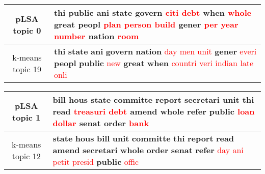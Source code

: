 \begin{center}\begin{tabularx}{\textwidth} {
  | c | >{\raggedright\arraybackslash}X | } \hline 
pLSA topic 0 & \textbf{thi} \textbf{public} \textbf{ani} \textbf{state} \textbf{govern} \textcolor{red}{citi} \textcolor{red}{debt} \textbf{when} \textcolor{red}{whole} \textbf{great} \textbf{peopl} \textcolor{red}{plan} \textcolor{red}{person} \textcolor{red}{build} \textbf{gener} \textcolor{red}{per} \textcolor{red}{year} \textcolor{red}{number} \textbf{nation} \textcolor{red}{room} \\ \hline 
k-means topic 19 & \textbf{thi} \textbf{state} \textbf{ani} \textbf{govern} \textbf{nation} \textcolor{red}{day} \textcolor{red}{men} \textcolor{red}{unit} \textbf{gener} \textcolor{red}{everi} \textbf{peopl} \textbf{public} \textcolor{red}{new} \textbf{great} \textbf{when} \textcolor{red}{countri} \textcolor{red}{veri} \textcolor{red}{indian} \textcolor{red}{late} \textcolor{red}{onli} \\ \hline 
\end{tabularx}

\end{center}

\begin{center}\begin{tabularx}{\textwidth} {
  | c | >{\raggedright\arraybackslash}X | } \hline 
pLSA topic 1 & \textbf{bill} \textbf{hous} \textbf{state} \textbf{committe} \textbf{report} \textbf{secretari} \textbf{unit} \textbf{thi} \textbf{read} \textcolor{red}{treasuri} \textcolor{red}{debt} \textbf{amend} \textbf{whole} \textbf{refer} \textbf{public} \textcolor{red}{loan} \textcolor{red}{dollar} \textbf{senat} \textbf{order} \textcolor{red}{bank} \\ \hline 
k-means topic 12 & \textbf{state} \textbf{hous} \textbf{bill} \textbf{unit} \textbf{committe} \textbf{thi} \textbf{report} \textbf{read} \textbf{amend} \textbf{secretari} \textbf{whole} \textbf{order} \textbf{senat} \textbf{refer} \textcolor{red}{day} \textcolor{red}{ani} \textcolor{red}{petit} \textcolor{red}{presid} \textbf{public} \textcolor{red}{offic} \\ \hline 
\end{tabularx}

\end{center}

